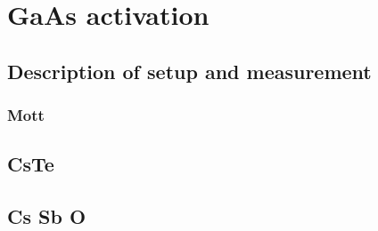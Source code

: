\chapter{GaAs activation}
\section{Description of setup and measurement}
\subsection{Mott}
\section{CsTe}
\section{Cs Sb O}
